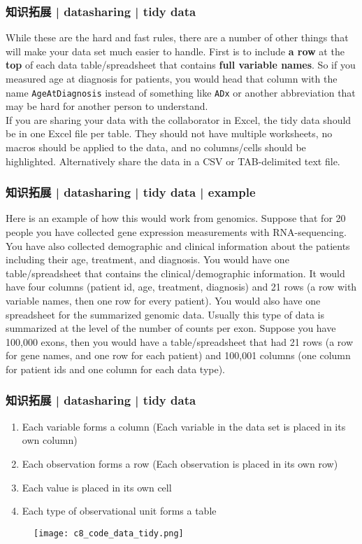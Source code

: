 \begin{frame}[fragile]
  \frametitle{知识拓展 | datasharing | tidy data}
  While these are the hard and fast rules, there are a number of other things that will make your data set much easier to handle. First is to include \textbf{a row} at the \textbf{top} of each data table/spreadsheet that contains \textbf{full variable names}. So if you measured age at diagnosis for patients, you would head that column with the name \verb|AgeAtDiagnosis| instead of something like \verb|ADx| or another abbreviation that may be hard for another person to understand. \\
  \vspace{1em}
  If you are sharing your data with the collaborator in Excel, the tidy data should be in one Excel file per table. They should not have multiple worksheets, no macros should be applied to the data, and no columns/cells should be highlighted. Alternatively share the data in a CSV or TAB-delimited text file.
\end{frame}

\begin{frame}
  \frametitle{知识拓展 | datasharing | tidy data | example}
  Here is an example of how this would work from genomics. Suppose that for 20 people you have collected gene expression measurements with RNA-sequencing. You have also collected demographic and clinical information about the patients including their age, treatment, and diagnosis. You would have one table/spreadsheet that contains the clinical/demographic information. It would have four columns (patient id, age, treatment, diagnosis) and 21 rows (a row with variable names, then one row for every patient). You would also have one spreadsheet for the summarized genomic data. Usually this type of data is summarized at the level of the number of counts per exon. Suppose you have 100,000 exons, then you would have a table/spreadsheet that had 21 rows (a row for gene names, and one row for each patient) and 100,001 columns (one column for patient ids and one column for each data type). 
\end{frame}

\begin{frame}
  \frametitle{知识拓展 | datasharing | tidy data}
  \begin{enumerate}
    \item Each variable forms a column (Each variable in the data set is placed in its own column)
    \item Each observation forms a row (Each observation is placed in its own row)
    \item Each value is placed in its own cell
    \item Each type of observational unit forms a table
  \end{enumerate}
  \begin{figure}
    \centering
    \texttt{[image: c8\_code\_data\_tidy.png]}
  \end{figure}
\end{frame}

